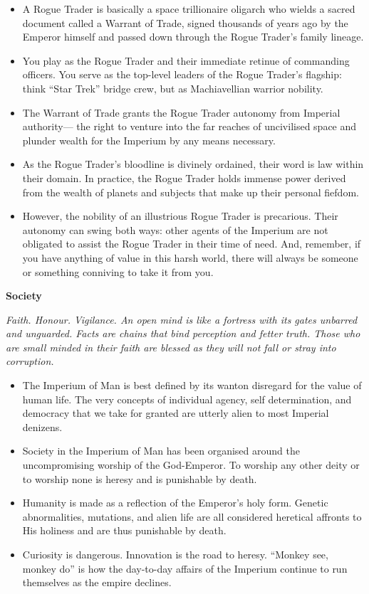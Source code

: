 \documentclass[10pt,a4paper]{article}
\newcommand{\rpgsection}[1]{%
  \vspace{0.8em}%
  {\headerfont\bfseries\Large #1}\par%
  \vspace{0.5em}%
}
\begin{document}
\begin{multicols}{2}
\begin{itemize}
  \item A Rogue Trader is basically a space trillionaire oligarch who wields a sacred document called a Warrant of Trade, signed thousands of years ago by the Emperor himself and passed down through the Rogue Trader's family lineage. 
  \item You play as the Rogue Trader and their immediate retinue of commanding officers. You serve as the top-level leaders of the Rogue Trader's flagship: think “Star Trek” bridge crew, but as Machiavellian warrior nobility.
  \item The Warrant of Trade grants the Rogue Trader autonomy from Imperial authority— the right to venture into the far reaches of uncivilised space and plunder wealth for the Imperium by any means necessary.
  \item As the Rogue Trader’s bloodline is divinely ordained, their word is law within their domain. In practice, the Rogue Trader holds immense power derived from the wealth of planets and subjects that make up their personal fiefdom.
  \item However, the nobility of an illustrious Rogue Trader is precarious. Their autonomy can swing both ways: other agents of the Imperium are not obligated to assist the Rogue Trader in their time of need. And, remember, if you have anything of value in this harsh world, there will always be someone or something conniving to take it from you.
\end{itemize}

\rpgsection{Society}
\textit{Faith. Honour. Vigilance. An open mind is like a fortress with its gates unbarred and unguarded. Facts are chains that bind perception and fetter truth. Those who are small minded in their faith are blessed as they will not fall or stray into corruption.}

\begin{itemize}
  \item The Imperium of Man is best defined by its wanton disregard for the value of human life. The very concepts of individual agency, self determination, and democracy that we take for granted are utterly alien to most Imperial denizens.
  \item Society in the Imperium of Man has been organised around the uncompromising worship of the God-Emperor. To worship any other deity or to worship none is heresy and is punishable by death.
  \item Humanity is made as a reflection of the Emperor’s holy form. Genetic abnormalities, mutations, and alien life are all considered heretical affronts to His holiness and are thus punishable by death.
  \item Curiosity is dangerous. Innovation is the road to heresy. “Monkey see, monkey do” is how the day-to-day affairs of the Imperium continue to run themselves as the empire declines.
\end{itemize}


\end{multicols}
\end{document}
